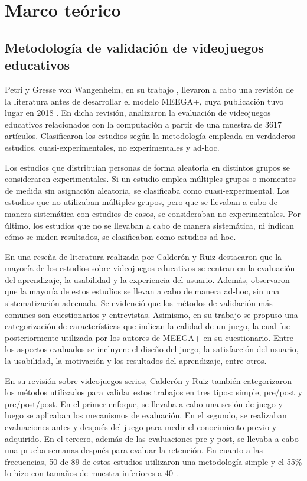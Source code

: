 \chapter{Marco teórico}

\section{Metodología de validación de videojuegos educativos}

Petri y Gresse von Wangenheim, en su trabajo \cite{HowGamesComputingEducationEvaluated}, llevaron a cabo una revisión de la literatura antes de desarrollar el modelo MEEGA+, cuya publicación tuvo lugar en 2018 \cite{meegaplus}. En dicha revisión, analizaron la evaluación de videojuegos educativos relacionados con la computación a partir de una muestra de 3617 artículos. Clasificaron los estudios según la metodología empleada en verdaderos estudios, cuasi-experimentales, no experimentales y ad-hoc.

Los estudios que distribuían personas de forma aleatoria en distintos grupos se consideraron experimentales. Si un estudio emplea múltiples grupos o momentos de medida sin asignación aleatoria, se clasificaba como cuasi-experimental. Los estudios que no utilizaban múltiples grupos, pero que se llevaban a cabo de manera sistemática con estudios de casos, se consideraban no experimentales. Por último, los estudios que no se llevaban a cabo de manera sistemática, ni indican cómo se miden resultados, se clasificaban como estudios ad-hoc.

En una reseña de literatura realizada por Calderón y Ruiz \cite{CalderonRuizReviewSeriousGamesEvaluation} destacaron que la mayoría de los estudios sobre videojuegos educativos se centran en la evaluación del aprendizaje, la usabilidad y la experiencia del usuario. Además, observaron que la mayoría de estos estudios se llevan a cabo de manera ad-hoc, sin una sistematización adecuada. Se evidenció que los métodos de validación más comunes son cuestionarios y entrevistas. Asimismo, en su trabajo se propuso una categorización de características que indican la calidad de un juego, la cual fue posteriormente utilizada por los autores de MEEGA+ \cite{meegaplus} en su cuestionario. Entre los aspectos evaluados se incluyen: el diseño del juego, la satisfacción del usuario, la usabilidad, la motivación y los resultados del aprendizaje, entre otros.

En su revisión sobre videojuegos serios, Calderón y Ruiz \cite{CalderonRuizReviewSeriousGamesEvaluation} también categorizaron los métodos utilizados para validar estos trabajos en tres tipos: simple, pre/post y pre/post/post. En el primer enfoque, se llevaba a cabo una sesión de juego y luego se aplicaban los mecanismos de evaluación. En el segundo, se realizaban evaluaciones antes y después del juego para medir el conocimiento previo y adquirido. En el tercero, además de las evaluaciones pre y post, se llevaba a cabo una prueba semanas después para evaluar la retención. En cuanto a las frecuencias, 50 de 89 de estos estudios utilizaron una metodología simple y el 55\% lo hizo con tamaños de muestra inferiores a 40 \cite{CalderonRuizReviewSeriousGamesEvaluation}.

